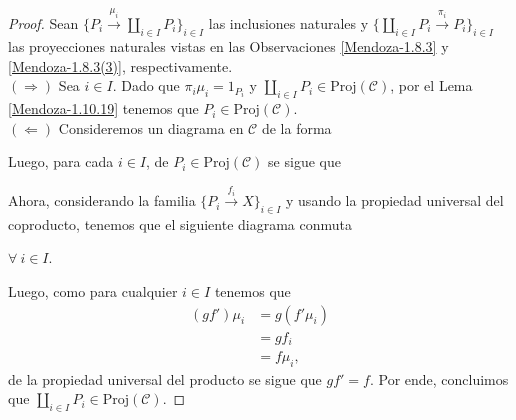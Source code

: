 \documentclass[tesis]{subfiles}
\begin{document}
\begin{proof}
    Sean $\{P_i\xrightarrow[]{\mu_i} \coprod_{i\in I}P_i\}_{i\in I}$ las inclusiones naturales y $\{\coprod_{i\in I}P_i\xrightarrow[]{\pi_i} P_i\}_{i\in I}$ las proyecciones naturales vistas en las Observaciones \ref{Mendoza-1.8.3} y \ref{Mendoza-1.8.3(3)}, respectivamente. \\

    $(\Rightarrow)$ Sea $i\in I$. Dado que $\pi_i\mu_i=1_{P_i}$ y $\coprod_{i\in I}P_i\in\text{Proj}(\mathscr{C})$, por el Lema \ref{Mendoza-1.10.19} tenemos que $P_i\in\text{Proj}(\mathscr{C})$. \\

    $(\Leftarrow)$ Consideremos un diagrama en $\mathscr{C}$ de la forma
    \begin{center}
    \end{center}
    Luego, para cada $i\in I$, de $P_i\in\text{Proj}(\mathscr{C})$ se sigue que
    \begin{center}
    \end{center}
    Ahora, considerando la familia $\{P_i\xrightarrow[]{f_i} X\}_{i\in I}$ y usando la propiedad universal del coproducto, tenemos que el siguiente diagrama conmuta
    \begin{center}
        $\forall \ i\in I$.
    \end{center}
    Luego, como para cualquier $i\in I$ tenemos que
    \begin{align*}
        (gf')\mu_i &= g(f'\mu_i) \\
                   &= gf_i \\
                   &= f\mu_i,
    \end{align*}
    de la propiedad universal del producto se sigue que $gf'=f$. Por ende, concluimos que $\coprod_{i\in I}P_i\in\text{Proj}(\mathscr{C})$.
\end{proof}
\end{document}
